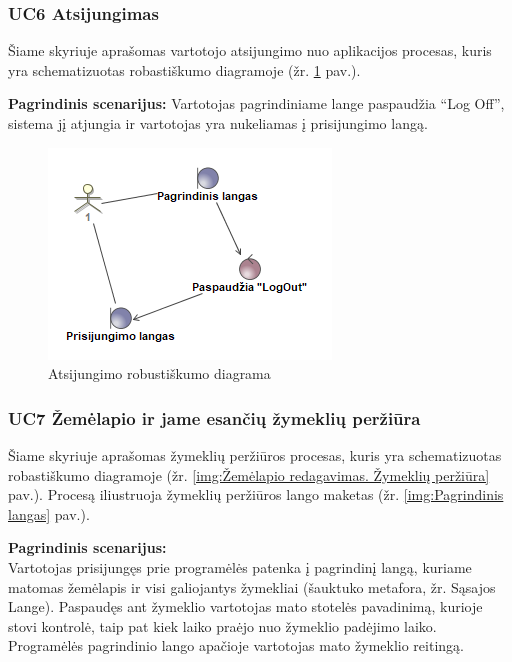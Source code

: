 \documentclass{VUMIFPSkursinis}
\begin{document}
\subsubsection{UC6 Atsijungimas}
	Šiame skyriuje aprašomas vartotojo atsijungimo nuo aplikacijos procesas, kuris yra schematizuotas robastiškumo diagramoje (žr. \ref{img:Atsijungimo robustiškumo diagrama} pav.).
	
	\textbf{Pagrindinis scenarijus:}
	Vartotojas pagrindiniame lange paspaudžia “Log Off”, sistema jį atjungia ir vartotojas yra nukeliamas į prisijungimo langą.
		\begin{figure}[H]
				\centering
				\includegraphics[scale=1]{img/Robustness_Atsijungimas}
				\caption{Atsijungimo robustiškumo diagrama}
				\label{img:Atsijungimo robustiškumo diagrama}
			\end{figure}

\subsubsection{UC7 Žemėlapio ir jame esančių žymeklių peržiūra}
	Šiame skyriuje aprašomas žymeklių peržiūros procesas, kuris yra schematizuotas robastiškumo diagramoje (žr. \ref{img:Žemėlapio redagavimas. Žymeklių peržiūra} pav.). 
	Procesą iliustruoja žymeklių peržiūros lango maketas (žr. \ref{img:Pagrindinis langas} pav.).

	\textbf{Pagrindinis scenarijus:}\\
	Vartotojas prisijungęs prie programėlės patenka į pagrindinį langą, kuriame matomas žemėlapis ir visi galiojantys žymekliai (šauktuko metafora, žr. Sąsajos Lange). Paspaudęs ant žymeklio vartotojas mato stotelės pavadinimą, kurioje stovi kontrolė, taip pat kiek laiko praėjo nuo žymeklio padėjimo laiko. Programėlės pagrindinio lango apačioje vartotojas mato žymeklio reitingą.
	
\end{document}
